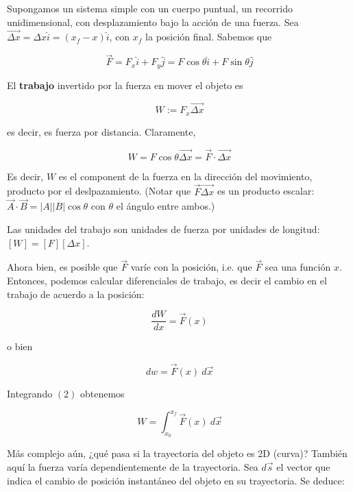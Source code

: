 \documentclass[12pt]{article}
\theoremstyle{definition}
\begin{document}
Supongamos un sistema simple con un cuerpo puntual, un recorrido unidimensional,
con desplazamiento bajo la acción de una fuerza. Sea $\vec{\Delta x} = \Delta x
\hat{i} = (x_f - x)\hat{i}$, con $x_f$ la posición final. Sabemos que 

\begin{equation*}
    \vec{F} = F_x \hat{i} + F_y \hat{j} = F \cos \theta \hat{i} + F \sin \theta
    \hat{j}
\end{equation*}

El \textbf{trabajo} invertido por la fuerza en mover el objeto es 

\begin{equation}
    W := F_x \vec{\Delta x}
\end{equation}

es decir, es fuerza por distancia. Claramente, 

\begin{equation*}
    W = F \cos \theta \vec{\Delta x} = \vec{F} \cdot \vec{\Delta x}
\end{equation*}

Es decir, $W$ es el component de la fuerza en la dirección del movimiento,
producto por el deslpazamiento. (Notar que $\vec{F} \vec{\Delta x}$ es un
producto escalar: $\vec{A} \cdot \vec{B} = \left| A \right|\left| B \right| \cos
\theta$ con $\theta$ el ángulo entre ambos.)

Las unidades del trabajo son unidades de fuerza por unidades de longitud: 
$\left[ W \right] = \left[ F \right] \left[ \Delta x \right] $.

Ahora bien, es posible que $\vec{F}$ varíe con la posición, i.e. que $\vec{F}$
sea una función $x$. Entonces, podemos calcular diferenciales de trabajo, es
decir el cambio en el trabajo de acuerdo a la posición:

\begin{equation*}
    \frac{dW}{dx} = \vec{F}(x)
\end{equation*}

o bien

\begin{equation}
    dw = \vec{F}(x) ~ d\vec{x}
\end{equation}

Integrando $(2)$ obtenemos 

\begin{equation}
    W = \int_{x_0}^{x_f} \vec{F}(x) ~ d\vec{x}
\end{equation}

Más complejo aún, ¿qué pasa si la trayectoria del objeto es 2D (curva)? También
aquí la fuerza varía dependientemente de la trayectoria. Sea $d\vec{s}$ el
vector que indica el cambio de posición instantáneo del objeto en su
trayectoria. Se deduce: 
\end{document}
